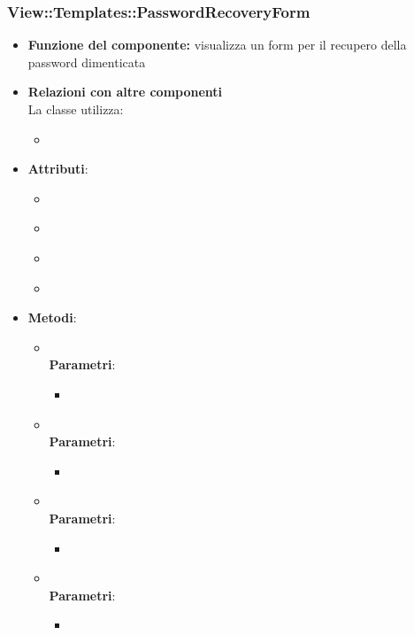  \subsubsection{View::Templates::PasswordRecoveryForm}
 \begin{itemize}
 \item\textbf{Funzione del componente:} visualizza un form per il recupero della password dimenticata
 \item\textbf{Relazioni con altre componenti}\\
 La classe utilizza:
 	\begin{itemize}
 		\item
 	\end{itemize}
 \item\textbf{Attributi}:
 	\begin{itemize}
 		\item\code{}\\
 		\item\code{}\\
 		\item\code{}\\
 		\item\code{}\\
 	\end{itemize}
 \item\textbf{Metodi}:
 	\begin{itemize}
 		\item\code{}\\
 		\textbf{Parametri}:
 			\begin{itemize}
 				\item\code{}\\
 			\end{itemize}
 		\item\code{}\\
 		\textbf{Parametri}:
 			\begin{itemize}
 				\item\code{}\\
 			\end{itemize}
 		\item\code{}\\
 		\textbf{Parametri}:
 			\begin{itemize}
 				\item\code{}\\
 			\end{itemize}
 		\item\code{}\\
 		\textbf{Parametri}:
 			\begin{itemize}
 				\item\code{}\\
 			\end{itemize}
 	\end{itemize}
 \end{itemize}
 
